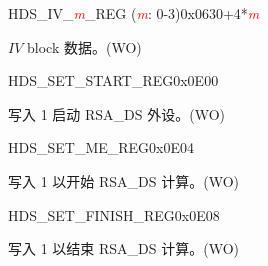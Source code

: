


\begin{register}{H}{DS\_IV\_\textcolor{red}{\it{m}}\_REG (\textcolor{red}{\it{m}}: 0-3)}{0x0630+4*\textcolor{red}{\it{m}}}\label{regdesc:DSIVREG}
%
\regnewline%
\begin{regdesc}\begin{reglist}
\item [DS\_IV\_\textcolor{red}{\it{m}}\_REG (\textcolor{red}{\it{m}}: 0-3)] \begin{math}IV\end{math} block 数据。(WO)
\end{reglist}\end{regdesc}
\end{register}


\begin{register}{H}{DS\_SET\_START\_REG}{0x0E00}\label{regdesc:DSSETSTARTREG}
%
%
\regnewline%
\begin{regdesc}\begin{reglist}
\item [DS\_SET\_START] 写入 1 启动 RSA\_DS 外设。(WO)
\end{reglist}\end{regdesc}
\end{register}


\begin{register}{H}{DS\_SET\_ME\_REG}{0x0E04}\label{regdesc:DSSETMEREG}
%
%
\regnewline%
\begin{regdesc}\begin{reglist}
\item [DS\_SET\_ME] 写入 1 以开始 RSA\_DS 计算。(WO)
\end{reglist}\end{regdesc}
\end{register}


\begin{register}{H}{DS\_SET\_FINISH\_REG}{0x0E08}\label{regdesc:DSSETFINISHREG}
%
%
\regnewline%
\begin{regdesc}\begin{reglist}
\item [DS\_SET\_FINISH] 写入 1 以结束 RSA\_DS 计算。(WO)
\end{reglist}\end{regdesc}
\end{register}



